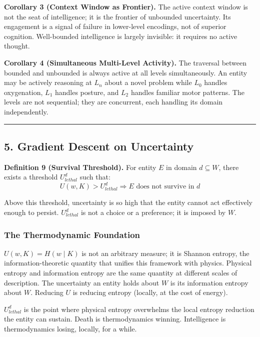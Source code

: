 \documentclass[
]{article}
\begin{document}
\textbf{Corollary 3 (Context Window as Frontier).} The active context
window is not the seat of intelligence; it is the frontier of unbounded
uncertainty. Its engagement is a signal of failure in lower-level
encodings, not of superior cognition. Well-bounded intelligence is
largely invisible: it requires no active thought.

\textbf{Corollary 4 (Simultaneous Multi-Level Activity).} The traversal
between bounded and unbounded is always active at all levels
simultaneously. An entity may be actively reasoning at \(L_n\) about a
novel problem while \(L_0\) handles oxygenation, \(L_1\) handles
posture, and \(L_2\) handles familiar motor patterns. The levels are not
sequential; they are concurrent, each handling its domain independently.

\begin{center}\rule{0.5\linewidth}{0.5pt}\end{center}

\subsection{5. Gradient Descent on
Uncertainty}\label{gradient-descent-on-uncertainty}

\textbf{Definition 9 (Survival Threshold).} For entity \(E\) in domain
\(d \subseteq W\), there exists a threshold \(U_{lethal}^d\) such that:
\[U(w, K) > U_{lethal}^d \Rightarrow E \text{ does not survive in } d\]

Above this threshold, uncertainty is so high that the entity cannot act
effectively enough to persist. \(U_{lethal}^d\) is not a choice or a
preference; it is imposed by \(W\).

\subsubsection{The Thermodynamic
Foundation}\label{the-thermodynamic-foundation}

\(U(w, K) = H(w \mid K)\) is not an arbitrary measure; it is Shannon
entropy, the information-theoretic quantity that unifies this framework
with physics. Physical entropy and information entropy are the same
quantity at different scales of description. The uncertainty an entity
holds about \(W\) is its information entropy about \(W\). Reducing \(U\)
is reducing entropy (locally, at the cost of energy).

\(U_{lethal}^d\) is the point where physical entropy overwhelms the
local entropy reduction the entity can sustain. Death is thermodynamics
winning. Intelligence is thermodynamics losing, locally, for a while.
\end{document}
